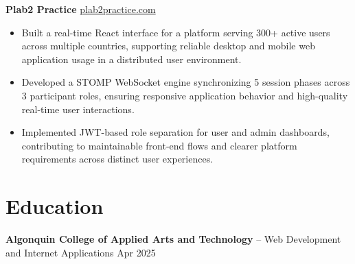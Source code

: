 \documentclass[11pt]{article}       %
\begin{document}
\textbf{Plab2 Practice} \hfill \href{https://plab2practice.com}{plab2practice.com} \\
\vspace{-9pt}
\begin{itemize}
  \item Built a real-time React interface for a platform serving 300+ active users across multiple countries, supporting reliable desktop and mobile web application usage in a distributed user environment.
  \item Developed a STOMP WebSocket engine synchronizing 5 session phases across 3 participant roles, ensuring responsive application behavior and high-quality real-time user interactions.
  \item Implemented JWT-based role separation for user and admin dashboards, contributing to maintainable front-end flows and clearer platform requirements across distinct user experiences.
\end{itemize}





\section*{Education}
\textbf{Algonquin College of Applied Arts and Technology} -- Web Development and Internet Applications
\hfill Apr 2025 \\
\end{document}
